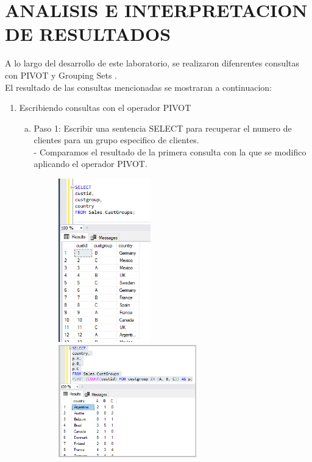 \section{ANALISIS E INTERPRETACION DE RESULTADOS} 

\par A lo largo del desarrollo de este laboratorio, se realizaron difenrentes consultas con PIVOT y Grouping Sets .\\
El resultado de las consultas mencionadas se mostraran a continuacion:


\begin{enumerate}[1.]
	\item Escribiendo consultas con el operador PIVOT
	\begin{enumerate}[a)]
	\item Paso 1: Escribir una sentencia SELECT para recuperar el numero de clientes para un grupo especifico de clientes.\\
		-  Comparamos el resultado de la primera consulta con la que se modifico aplicando el operador PIVOT.
		\begin{figure}[H]
		\begin{center}
		\includegraphics[width=4cm]{./Imagenes/1-2}
		\includegraphics[width=6cm]{./Imagenes/1-3}
		\end{center}
		\end{figure}


\end{enumerate}
\end{enumerate}
